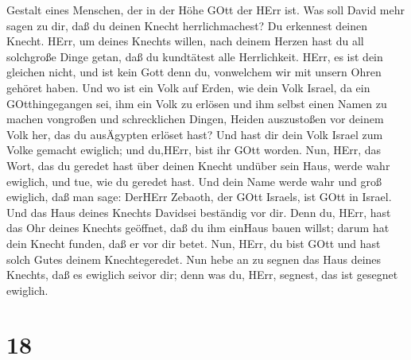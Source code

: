 Gestalt eines Menschen, der in der Höhe GOtt der HErr ist. 
Was soll David mehr sagen zu dir, daß du deinen Knecht herrlichmachest?
Du erkennest deinen Knecht.  HErr, um deines Knechts
willen, nach deinem Herzen hast du all solchgroße Dinge getan, daß du
kundtätest alle Herrlichkeit.  HErr, es ist dein gleichen
nicht, und ist kein Gott denn du, vonwelchem wir mit unsern Ohren
gehöret haben.  Und wo ist ein Volk auf Erden, wie dein
Volk Israel, da ein GOtthingegangen sei, ihm ein Volk zu erlösen und ihm
selbst einen Namen zu machen vongroßen und schrecklichen Dingen, Heiden
auszustoßen vor deinem Volk her, das du ausÄgypten erlöset hast?
 Und hast dir dein Volk Israel zum Volke gemacht ewiglich;
und du,HErr, bist ihr GOtt worden.  Nun, HErr, das Wort,
das du geredet hast über deinen Knecht undüber sein Haus, werde wahr
ewiglich, und tue, wie du geredet hast.  Und dein Name
werde wahr und groß ewiglich, daß man sage: DerHErr Zebaoth, der GOtt
Israels, ist GOtt in Israel. Und das Haus deines Knechts Davidsei
beständig vor dir.  Denn du, HErr, hast das Ohr deines
Knechts geöffnet, daß du ihm einHaus bauen willst; darum hat dein Knecht
funden, daß er vor dir betet.  Nun, HErr, du bist GOtt und
hast solch Gutes deinem Knechtegeredet.  Nun hebe an zu
segnen das Haus deines Knechts, daß es ewiglich seivor dir; denn was du,
HErr, segnest, das ist gesegnet ewiglich.

\hypertarget{section-17}{%
\section{18}\label{section-17}}

